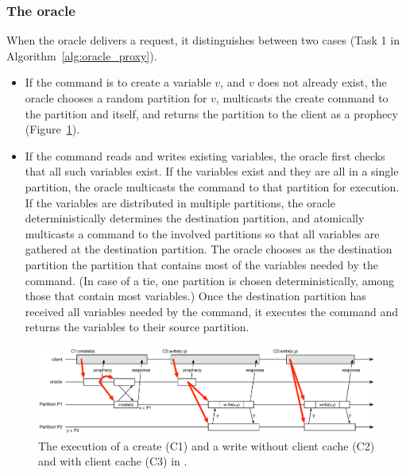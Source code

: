 \subsubsection{The oracle} 

When the oracle delivers a request, it distinguishes between two cases (Task 1 in Algorithm~\ref{alg:oracle_proxy}).
\begin{itemize}
\item If the command is to create a variable $v$, and $v$ does not already exist, the oracle chooses a random partition for $v$, multicasts the create command to the partition and itself, and returns the partition to the client as a prophecy (Figure~\ref{fig:oracle_repartition}).
\item If the command reads and writes existing variables, the oracle first checks that all such variables exist.
If the variables exist and they are all in a single partition, the oracle multicasts the command to that partition for execution.
If the variables are distributed in multiple partitions, the oracle deterministically determines the destination partition, and atomically multicasts a command to the involved partitions so that all variables are gathered at the destination partition.
The oracle chooses as the destination partition the partition that contains most of the variables needed by the command.
(In case of a tie, one partition is chosen deterministically, among those that contain most variables.)
Once the destination partition has received all variables needed by the command, it executes the command and returns the variables to their source partition.

\end{itemize}






\begin{figure}
\begin{minipage}[b]{1\linewidth} %
\centering
      \includegraphics[width=\linewidth]{figures/dynastar}
\end{minipage}
\caption{The execution of a create (C1) and a write without client cache (C2) and with client cache (C3) in \dynastar.}
\label{fig:oracle_repartition}
\end{figure}

